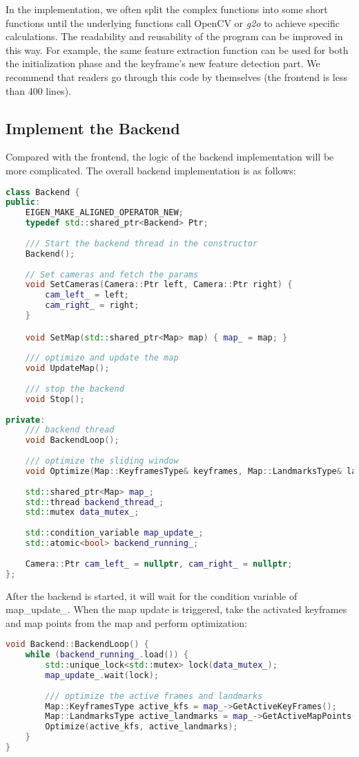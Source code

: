 In the implementation, we often split the complex functions into some short functions until the underlying functions call OpenCV or \textit{g2o} to achieve specific calculations. The readability and reusability of the program can be improved in this way. For example, the same feature extraction function can be used for both the initialization phase and the keyframe's new feature detection part. We recommend that readers go through this code by themselves (the frontend is less than 400 lines).

\subsection{Implement the Backend}
Compared with the frontend, the logic of the backend implementation will be more complicated. The overall backend implementation is as follows:
\begin{lstlisting}[language=c++,caption=slambook2/ch13/include/myslam/backend.h]
class Backend {
public:
	EIGEN_MAKE_ALIGNED_OPERATOR_NEW;
	typedef std::shared_ptr<Backend> Ptr;
	
	/// Start the backend thread in the constructor 
	Backend();
	
	// Set cameras and fetch the params
	void SetCameras(Camera::Ptr left, Camera::Ptr right) {
		cam_left_ = left;
		cam_right_ = right;
	}

	void SetMap(std::shared_ptr<Map> map) { map_ = map; }
	
	/// optimize and update the map
	void UpdateMap();
	
	/// stop the backend
	void Stop();
	
private:
	/// backend thread
	void BackendLoop();
	
	/// optimize the sliding window
	void Optimize(Map::KeyframesType& keyframes, Map::LandmarksType& landmarks);
	
	std::shared_ptr<Map> map_;
	std::thread backend_thread_;
	std::mutex data_mutex_;
	
	std::condition_variable map_update_;
	std::atomic<bool> backend_running_;
	
	Camera::Ptr cam_left_ = nullptr, cam_right_ = nullptr;
};
\end{lstlisting}

After the backend is started, it will wait for the condition variable of map\_update\_. When the map update is triggered, take the activated keyframes and map points from the map and perform optimization:
\begin{lstlisting}[language=c++,caption=slambook2/ch13/src/backend.cpp]
void Backend::BackendLoop() {
	while (backend_running_.load()) {
		std::unique_lock<std::mutex> lock(data_mutex_);
		map_update_.wait(lock);
		
		/// optimize the active frames and landmarks
		Map::KeyframesType active_kfs = map_->GetActiveKeyFrames();
		Map::LandmarksType active_landmarks = map_->GetActiveMapPoints();
		Optimize(active_kfs, active_landmarks);
	}
}
\end{lstlisting}

